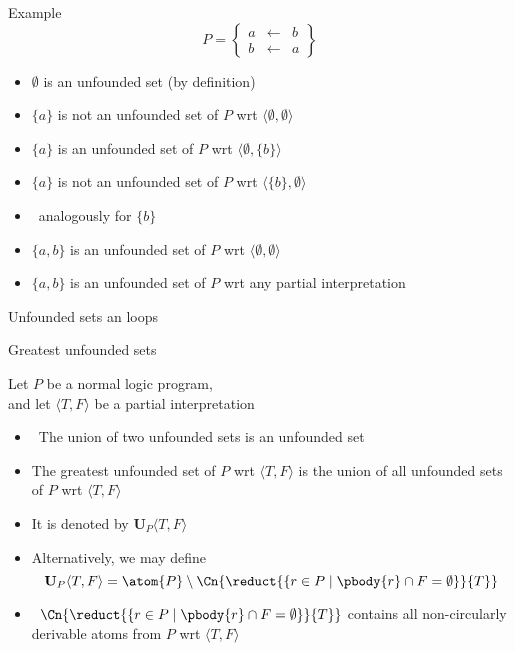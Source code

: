 \begin{frame}{Example}
%
\[
P
=
\left\{
  \begin{array}{lcl}
    a &\leftarrow & b \\
    b &\leftarrow & a
  \end{array}
\right\}
\]
\medskip
\begin{itemize}
\item<2-> $\emptyset$ is an unfounded set (by definition)
\smallskip
\item<3-> $\{a\}$ is not an unfounded set of $P$ wrt $\langle\emptyset,\emptyset\rangle$
\item<4-> $\{a\}$ is     an unfounded set of $P$ wrt $\langle\emptyset,\{b\}\rangle$
\item<5-> $\{a\}$ is not an unfounded set of $P$ wrt $\langle\{b\},\emptyset\rangle$
\smallskip
\item<6>[]\itarrow\ analogously for $\{b\}$
\smallskip
\item<7-> $\{a,b\}$ is     an unfounded set of $P$ wrt $\langle\emptyset,\emptyset\rangle$
\item<8-> $\{a,b\}$ is     an unfounded set of $P$ wrt any partial interpretation
\end{itemize}

\end{frame}
\begin{frame}{Unfounded sets an loops}

\end{frame}
\begin{frame}{Greatest unfounded sets}\label{unf:greatest}

Let $P$ be a normal logic program,\\ and let
$\langle T,F \rangle$ be a partial interpretation

\begin{itemize}
\item<2->  \ The union of two unfounded sets is an unfounded set
\item<3-> The \alert{greatest unfounded set} of $P$ wrt $\langle T,F \rangle$ is the
  union of all unfounded sets of $P$ wrt $\langle T,F \rangle$
\item<4-> [] It is denoted by $\mathbf{U}_P\langle T,F \rangle$
\item<5-> Alternatively, we may define
  \[
  \mathbf{U}_P\langle T,F \rangle =
  \atom{P} \setminus
  \Cn{\reduct{\{r \in P \mid \pbody{r} \cap F = \emptyset\}}{T}}\/
  \]
\item<6->  \
  \(
  \Cn{\reduct{\{r \in P \mid \pbody{r} \cap F = \emptyset\}}{T}}
  \)
  contains all non-circularly derivable atoms from $P$ wrt $\langle T,F \rangle$
\end{itemize}
\end{frame}
%
